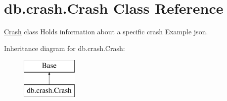 \hypertarget{classdb_1_1crash_1_1_crash}{}\section{db.\+crash.\+Crash Class Reference}
\label{classdb_1_1crash_1_1_crash}


\mbox{\hyperlink{classdb_1_1crash_1_1_crash}{Crash}} class Holds information about a specific crash Example json.  


Inheritance diagram for db.\+crash.\+Crash\+:\begin{figure}[H]
\begin{center}
\leavevmode
\includegraphics[height=2.000000cm]{d8/dfe/classdb_1_1crash_1_1_crash}
\end{center}
\end{figure}
